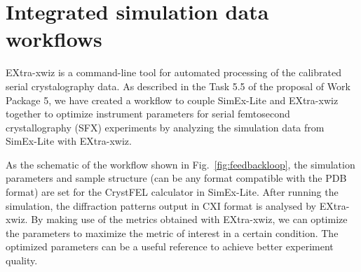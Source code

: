 \documentclass[11pt, a4paper]{article}
\begin{document}



\section{Integrated simulation data workflows\label{sec:simdata}}
EXtra-xwiz is a command-line tool for automated processing of the calibrated serial crystalography data\cite{xwiz}. As described in the Task 5.5 of the proposal of Work Package 5, we have created a workflow to couple SimEx-Lite and EXtra-xwiz together to optimize instrument parameters for serial femtosecond crystallography (SFX) experiments by analyzing the simulation data from SimEx-Lite with EXtra-xwiz. 

As the schematic of the workflow shown in Fig.~\ref{fig:feedbackloop}, the simulation parameters and sample structure (can be any format compatible with the PDB format) are set for the CrystFEL calculator in SimEx-Lite. After running the simulation, the diffraction patterns output in CXI format is analysed by EXtra-xwiz. By making use of the metrics obtained with EXtra-xwiz, we can optimize the parameters to maximize the metric of interest in a certain condition. The optimized parameters can be a useful reference to achieve better experiment quality.
\end{document}
